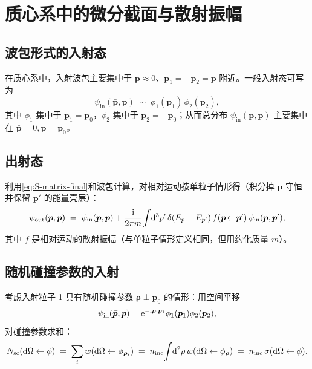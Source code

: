 \section{质心系中的微分截面与散射振幅}

\subsection{波包形式的入射态}

在质心系中，入射波包主要集中于 $\bar{\bm{p}}\approx 0$、$\bm{p}_1=-\bm{p}_2=\bm{p}$ 附近。一般入射态可写为
\begin{equation}
  \psi_{\text{in}}(\bar{\bm{p}},\bm{p}) \;\sim\; \phi_1(\bm{p}_1)\,\phi_2(\bm{p}_2),
  \label{eq:in-packet-form}
\end{equation}
其中 $\phi_1$ 集中于 $\bm{p}_1=\bm{p}_0$，$\phi_2$ 集中于 $\bm{p}_2=-\bm{p}_0$；从而总分布 $\psi_{\text{in}}(\bar{\bm{p}},\bm{p})$ 主要集中在 $\bar{\bm{p}}=0,\bm{p}=\bm{p}_0$。

\subsection{出射态}

利用\eqref{eq:S-matrix-final}和波包计算，对相对运动按单粒子情形得（积分掉 $\bar{\bm{p}}$ 守恒并保留 $\bm{p}'$ 的能量壳层）：
\begin{equation}
  \psi_{\text{out}}(\bar{\bm{p}},\bm{p})
  \;=\; \psi_{\text{in}}(\bar{\bm{p}},\bm{p})
        + \frac{\mathrm{i}}{2\pi m}\!\int\! \mathrm{d}^3 p'\,\delta(E_p-E_{p'})\,
          f(\bm{p}\!\leftarrow\!\bm{p}')\,\psi_{\text{in}}(\bar{\bm{p}},\bm{p}'),
  \label{eq:psi-out-2p}
\end{equation}
其中 $f$ 是相对运动的散射振幅（与单粒子情形定义相同，但用约化质量 $m$）。

\subsection{随机碰撞参数的入射}

考虑入射粒子 1 具有随机碰撞参数 $\bm{\rho}\perp\bm{p}_0$ 的情形：用空间平移
\[
  \psi_{\text{in}}(\bar{\bm{p}},\bm{p}) = \mathrm{e}^{-\mathrm{i}\bm{\rho}\cdot\bm{p}_1}\phi_1(\bm{p}_1)\phi_2(\bm{p}_2),
\]
对碰撞参数求和：
\begin{equation}
  N_{\text{sc}}(\mathrm{d}\Omega\leftarrow\phi)
  \;=\; \sum_i w(\mathrm{d}\Omega\leftarrow\phi_{\bm{\rho}_i})
  \;=\; n_{\text{inc}}\!\int\! \mathrm{d}^2\rho\, w(\mathrm{d}\Omega\leftarrow\phi_{\bm{\rho}})
  \;=\; n_{\text{inc}}\,\sigma(\mathrm{d}\Omega\leftarrow\phi).
  \label{eq:Nsc-impact}
\end{equation}

